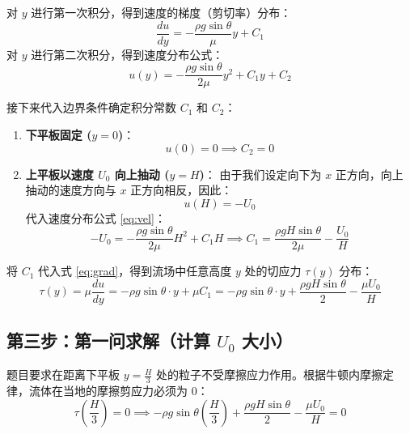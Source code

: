 \documentclass[11pt,a4paper]{article}
\begin{document}
对 $y$ 进行第一次积分，得到速度的梯度（剪切率）分布：
\begin{equation}
    \frac{du}{dy} = -\frac{\rho g \sin\theta}{\mu} y + C_1
    \label{eq:grad}
\end{equation}
对 $y$ 进行第二次积分，得到速度分布公式：
\begin{equation}
    u(y) = -\frac{\rho g \sin\theta}{2\mu} y^2 + C_1 y + C_2
    \label{eq:vel}
\end{equation}

接下来代入边界条件确定积分常数 $C_1$ 和 $C_2$：
\begin{enumerate}
    \item \textbf{下平板固定 ($y = 0$)}：
    \begin{equation}
        u(0) = 0 \implies C_2 = 0
    \end{equation}
    \item \textbf{上平板以速度 $U_0$ 向上抽动 ($y = H$)}：
    由于我们设定向下为 $x$ 正方向，向上抽动的速度方向与 $x$ 正方向相反，因此：
    \begin{equation}
        u(H) = -U_0
    \end{equation}
    代入速度分布公式 \eqref{eq:vel}：
    \begin{equation}
        -U_0 = -\frac{\rho g \sin\theta}{2\mu} H^2 + C_1 H \implies C_1 = \frac{\rho g H \sin\theta}{2\mu} - \frac{U_0}{H}
    \end{equation}
\end{enumerate}

将 $C_1$ 代入式 \eqref{eq:grad}，得到流场中任意高度 $y$ 处的切应力 $\tau(y)$ 分布：
\begin{equation}
    \tau(y) = \mu \frac{du}{dy} = -\rho g \sin\theta \cdot y + \mu C_1 = -\rho g \sin\theta \cdot y + \frac{\rho g H \sin\theta}{2} - \frac{\mu U_0}{H}
    \label{eq:stress}
\end{equation}

\newpage

\subsection{第三步：第一问求解（计算 $U_0$ 大小）}
题目要求在距离下平板 $y = \frac{H}{3}$ 处的粒子不受摩擦应力作用。根据牛顿内摩擦定律，流体在当地的摩擦剪应力必须为 $0$：
\begin{equation}
    \tau\left(\frac{H}{3}\right) = 0 \implies -\rho g \sin\theta \left( \frac{H}{3} \right) + \frac{\rho g H \sin\theta}{2} - \frac{\mu U_0}{H} = 0
\end{equation}
\end{document}
